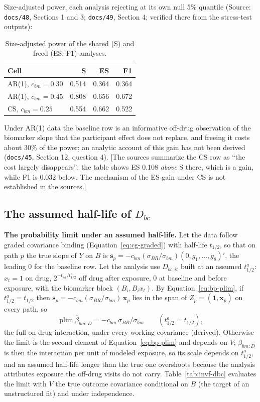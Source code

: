 \documentclass[11pt]{article}
\newcommand{\note}[1]{\textcolor{blue!60!black}{\small [#1]}}
\newcommand{\code}[1]{\texttt{#1}}
\begin{document}
Size-adjusted power, each analysis rejecting at its own null 5\%
quantile (Source: \code{docs/48}, Sections 1 and 3; \code{docs/49},
Section 4; verified there from the stress-test outputs):

\begin{table}[h]
\centering\small
\caption{Size-adjusted power of the shared (S) and freed (ES, F1)
analyses.}
\label{tab:bp-cost}
\begin{tabular}{@{}lrrr@{}}
\toprule
Cell & S & ES & F1 \\
\midrule
AR(1), $c_{bm} = 0.30$ & 0.514 & 0.364 & 0.364 \\
AR(1), $c_{bm} = 0.45$ & 0.808 & 0.656 & 0.672 \\
CS, $c_{bm} = 0.25$ & 0.554 & 0.662 & 0.522 \\
\bottomrule
\end{tabular}
\end{table}

\noindent Under AR(1) data the baseline row is an informative off-drug
observation of the biomarker slope that the participant effect does
not replace, and freeing it costs about 30\% of the power; an analytic
account of this gain has not been derived (\code{docs/45}, Section 12,
question 4). \note{The sources summarize the CS row as ``the cost
largely disappears''; the table shows ES 0.108 \emph{above} S there,
which is a gain, while F1 is 0.032 below. The mechanism of the ES gain
under CS is not established in the sources.}

\subsection{The assumed half-life of $D_{bc}$}
\label{sec:invf-dbc}

\textbf{The probability limit under an assumed half-life.} Let the data
follow graded covariance binding (Equation~\eqref{eq:cg-graded}) with
half-life $t_{1/2}$, so that on path $p$ the true slope of $Y$ on $B$ is
$\mathbf s_p = -c_{bm}(\sigma_{BR}/\sigma_{bm})(0, g_1, \dots, g_8)'$,
the leading 0 for the baseline row. Let the analysis use $D_{bc,it}$
built at an assumed $t_{1/2}^a$: $x_t = 1$ on drug, $2^{-t_{sd}/t_{1/2}^a}$
off drug after exposure, 0 at baseline and before exposure, with the
biomarker block $(B_i, B_i x_t)$. By Equation~\eqref{eq:bp-plim}, if
$t_{1/2}^a = t_{1/2}$ then $\mathbf s_p = -c_{bm}(\sigma_{BR}/\sigma_{bm})
\,\mathbf x_p$ lies in the span of $Z_p = (\mathbf 1, \mathbf x_p)$ on
every path, so
\begin{equation}
\operatorname{plim}\hat\beta_{bm:D} = -c_{bm}\,\sigma_{BR}/\sigma_{bm}
  \qquad (t_{1/2}^a = t_{1/2}),
\label{eq:invf-dbc-exact}
\end{equation}
the full on-drug interaction, under every working covariance (derived).
Otherwise the limit is the second element of
Equation~\eqref{eq:bp-plim} and depends on $V$; $\beta_{bm:D}$ is then
the interaction per unit of modeled exposure, so its scale depends on
$t_{1/2}^a$, and an assumed half-life longer than the true one overshoots
because the analysis attributes exposure the off-drug visits do not
carry. Table~\ref{tab:invf-dbc} evaluates the limit with $V$ the true
outcome covariance conditional on $B$ (the target of an unstructured
fit) and under independence.
\end{document}

